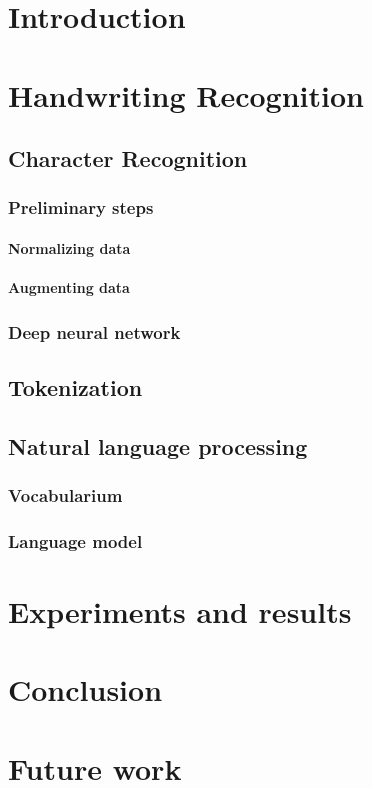 \documentclass{article}
\begin{document}
 

\begin{abstract} 
\end{abstract} 

\section{Introduction}

\section{Handwriting Recognition}

\subsection{Character Recognition}

\subsubsection{Preliminary steps}

\paragraph{Normalizing data} 
\paragraph{Augmenting data}

\subsubsection{Deep neural network}

\subsection{Tokenization}

\subsection{Natural language processing}

\subsubsection{Vocabularium}
\subsubsection{Language model}

\section{Experiments and results}

\section{Conclusion}

\section{Future work}
\end{document}

